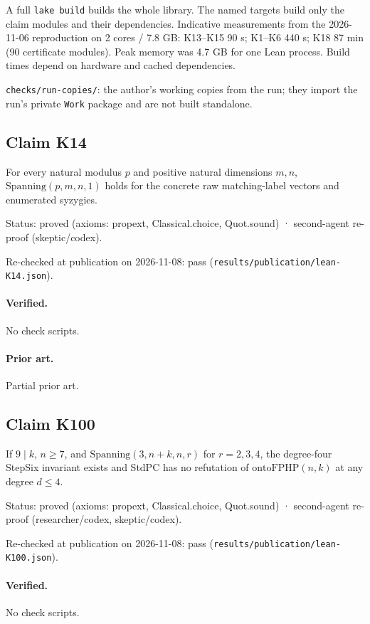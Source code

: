 \documentclass{article}
\begin{document}
A full \texttt{lake build} builds the whole library. The named targets build only the claim modules and their dependencies. Indicative measurements from the 2026-11-06 reproduction on 2 cores / 7.8 GB: K13--K15 90 s; K1--K6 440 s; K18 87 min (90 certificate modules). Peak memory was 4.7 GB for one Lean process. Build times depend on hardware and cached dependencies.

\texttt{checks/run-copies/}: the author's working copies from the run; they import the run's private \texttt{Work} package and are not built standalone.

\subsection*{Claim K14}

For every natural modulus $p$ and positive natural dimensions $m,n$, $\mathrm{Spanning}(p,m,n,1)$ holds for the concrete raw matching-label vectors and enumerated syzygies.

Status: proved (axioms: propext, Classical.choice, Quot.sound) · second-agent re-proof (skeptic/codex).

Re-checked at publication on 2026-11-08: pass (\texttt{results/publication/lean-K14.json}).

\paragraph{Verified.}
No check scripts.

\paragraph{Prior art.} Partial prior art.

\subsection*{Claim K100}

If $9\mid k$, $n\ge7$, and $\mathrm{Spanning}(3,n+k,n,r)$ for $r=2,3,4$, the degree-four StepSix invariant exists and StdPC has no refutation of $\mathrm{ontoFPHP}(n,k)$ at any degree $d\le4$.

Status: proved (axioms: propext, Classical.choice, Quot.sound) · second-agent re-proof (researcher/codex, skeptic/codex).

Re-checked at publication on 2026-11-08: pass (\texttt{results/publication/lean-K100.json}).

\paragraph{Verified.}
No check scripts.
\end{document}
